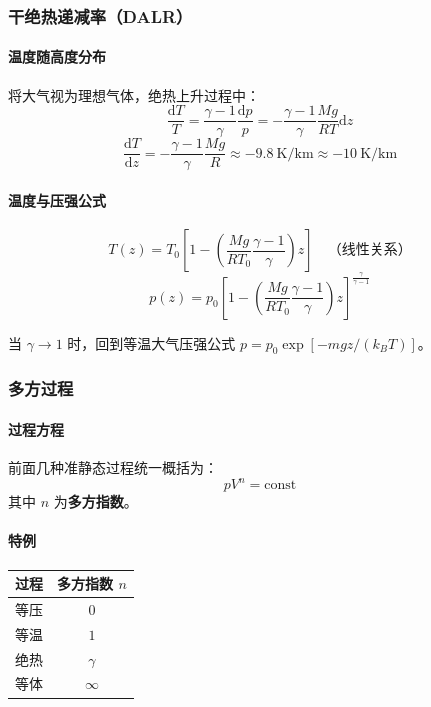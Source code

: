 \documentclass[UTF8]{ctexart}
\begin{document}
\subsubsection{干绝热递减率（DALR）}

\paragraph{温度随高度分布}
将大气视为理想气体，绝热上升过程中：
\[
\frac{\mathrm{d}T}{T}=\frac{\gamma-1}{\gamma}\frac{\mathrm{d}p}{p}
=-\frac{\gamma-1}{\gamma}\frac{Mg}{RT}\mathrm{d}z
\]
\[
\boxed{\frac{\mathrm{d}T}{\mathrm{d}z}=-\frac{\gamma-1}{\gamma}\frac{Mg}{R}
\approx -9.8\ \mathrm{K/km}\approx -10\ \mathrm{K/km}}
\]

\paragraph{温度与压强公式}
\[
T(z)=T_0\left[1-\left(\frac{Mg}{RT_0}\frac{\gamma-1}{\gamma}\right)z\right]
\quad\text{（线性关系）}
\]
\[
p(z)=p_0\left[1-\left(\frac{Mg}{RT_0}\frac{\gamma-1}{\gamma}\right)z\right]^{\frac{\gamma}{\gamma-1}}
\]

当 $\gamma\to 1$ 时，回到等温大气压强公式 $p=p_0\exp[-mgz/(k_BT)]$。

\subsubsection{多方过程}

\paragraph{过程方程}
前面几种准静态过程统一概括为：
\[
\boxed{pV^n=\text{const}}
\]
其中 $n$ 为\textbf{多方指数}。

\paragraph{特例}
\begin{center}
\begin{tabular}{c|c}
\hline
过程 & 多方指数 $n$ \\
\hline
等压 & $0$ \\
等温 & $1$ \\
绝热 & $\gamma$ \\
等体 & $\infty$ \\
\hline
\end{tabular}
\end{center}
\end{document}
